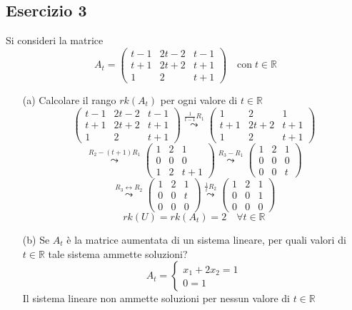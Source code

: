 \documentclass[a4paper]{article}
\theoremstyle{break}
\theoremstyle{break}
\theoremstyle{break}
\theoremstyle{break}
\begin{document}
\subsection{Esercizio 3}
Si consideri la matrice
\[
	A_t = \begin{pmatrix}
		t-1 & 2t-2 & t-1 \\
		t+1 & 2t+2 & t+1 \\
		1   & 2    & t+1
	\end{pmatrix}
	\quad
	\text{con} \; t \in \mathbb{R}
\]
\begin{enumerate}
	\item[(a)] Calcolare il rango \( rk(A_t) \) per ogni valore di \( t \in \mathbb{R} \)
	      \[
		      \begin{pmatrix}
			      t-1 & 2t-2 & t-1 \\
			      t+1 & 2t+2 & t+1 \\
			      1   & 2    & t+1
		      \end{pmatrix}
		      \stackrel{\frac{1}{t-1}R_1}{\leadsto}
		      \begin{pmatrix}
			      1   & 2    & 1   \\
			      t+1 & 2t+2 & t+1 \\
			      1   & 2    & t+1
		      \end{pmatrix}
	      \]
	      \[
		      \stackrel{R_2 - (t+1)R_1}{\leadsto}
		      \begin{pmatrix}
			      1 & 2 & 1   \\
			      0 & 0 & 0   \\
			      1 & 2 & t+1
		      \end{pmatrix}
		      \stackrel{R_3 - R_1}{\leadsto}
		      \begin{pmatrix}
			      1 & 2 & 1 \\
			      0 & 0 & 0 \\
			      0 & 0 & t
		      \end{pmatrix}
	      \]
	      \[
		      \stackrel{R_3 \leftrightarrow R_2}{\leadsto}
		      \begin{pmatrix}
			      1 & 2 & 1 \\
			      0 & 0 & t \\
			      0 & 0 & 0
		      \end{pmatrix}
		      \stackrel{\frac{1}{t}R_2}{\leadsto}
		      \begin{pmatrix}
			      1 & 2 & 1 \\
			      0 & 0 & 1 \\
			      0 & 0 & 0
		      \end{pmatrix}
	      \]
	      \[
		      rk(U) = rk(A_t) = 2 \quad \forall t \in \mathbb{R}
	      \]
	\item[(b)] Se \( A_t \) è la matrice aumentata di un sistema lineare, per quali valori
	      di \( t \in \mathbb{R} \)  tale sistema ammette soluzioni?
        \[
        A_t = \begin{cases}
          x_1 + 2x_2 = 1 \\
          0 = 1
        \end{cases}
        \] 
        Il sistema lineare non ammette soluzioni per nessun valore di \( t \in \mathbb{R} \)
\end{enumerate}
\end{document}
